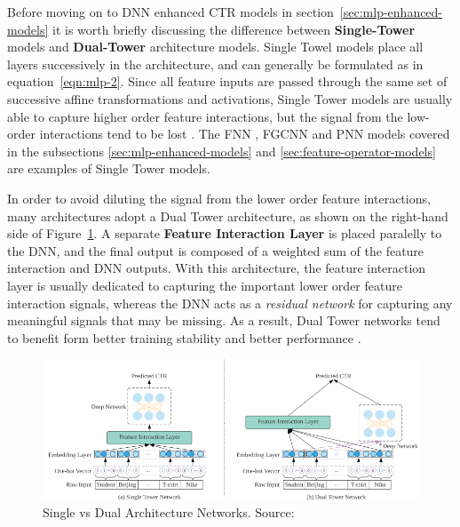 \documentclass{mldsmsc}
\begin{document}
Before moving on to DNN enhanced CTR models in section~\ref{sec:mlp-enhanced-models}
it is worth briefly discussing the difference between \textbf{Single-Tower}
models and \textbf{Dual-Tower} architecture models. Single Towel models place
all layers successively in the architecture, and can generally be formulated
as in equation~\ref{eqn:mlp-2}. Since all feature inputs are passed through
the same set of successive affine transformations and activations, Single Tower
models are usually able to capture higher order feature interactions, but the signal
from the low-order interactions tend to be lost \citep{RefWorks:zhang2021deep}.
The FNN \citep{RefWorks:zhang2016deep}, FGCNN
\citep{RefWorks:liu2019feature} and PNN \citep{RefWorks:qu2016product-based} models covered in the subsections 
\ref{sec:mlp-enhanced-models} and \ref{sec:feature-operator-models}
are examples of Single Tower models.

In order to avoid diluting the signal from the lower order feature interactions, many architectures
adopt a Dual Tower architecture, as shown on the right-hand side of
Figure~\ref{fig:single-dual-models}. A separate \textbf{Feature Interaction Layer}
is placed paralelly to the DNN, and the final output is composed of a weighted sum
of the feature interaction and DNN outputs. With this architecture, the feature interaction
layer is usually dedicated to capturing the important lower order feature interaction signals,
whereas the DNN acts as a \emph{residual network} for capturing any meaningful signals that may
be missing. As a result, Dual Tower networks tend to benefit form better training stability and
better performance \citep{RefWorks:zhang2021deep}.

\begin{figure}[h]
    \centering
    \includegraphics[width=\textwidth]{../figures/single_dual_dnn.png}
    \caption{Single vs Dual Architecture Networks. Source: \citep{RefWorks:zhang2021deep}}
    \label{fig:single-dual-models}
\end{figure}
\end{document}
